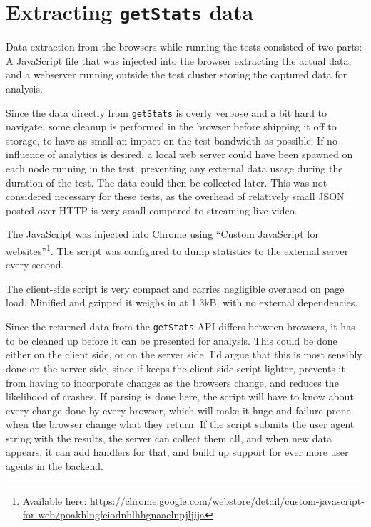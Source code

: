 \chapter{Extracting \texttt{getStats} data}

Data extraction from the browsers while running the tests consisted of two parts: A JavaScript file that was injected into the browser extracting the actual data, and a webserver running outside the test cluster storing the captured data for analysis.

Since the data directly from \texttt{getStats} is overly verbose and a bit hard to navigate, some cleanup is performed in the browser before shipping it off to storage, to have as small an impact on the test bandwidth as possible. If no influence of analytics is desired, a local web server could have been spawned on each node running in the test, preventing any external data usage during the duration of the test. The data could then be collected later. This was not considered necessary for these tests, as the overhead of relatively small JSON posted over HTTP is very small compared to streaming live video.

The JavaScript was injected into Chrome using ``Custom JavaScript for websites''\footnote{Available here: \url{https://chrome.google.com/webstore/detail/custom-javascript-for-web/poakhlngfciodnhlhhgnaaelnpjljija}}. The script was configured to dump statistics to the external server every second.

The client-side script is very compact and carries negligible overhead on page load. Minified and gzipped it weighs in at 1.3kB, with no external dependencies.

Since the returned data from the \texttt{getStats} API differs between browsers, it has to be cleaned up before it can be presented for analysis. This could be done either on the client side, or on the server side. I'd argue that this is most sensibly done on the server side, since if keeps the client-side script lighter, prevents it from having to incorporate changes as the browsers change, and reduces the likelihood of crashes. If parsing is done here, the script will have to know about every change done by every browser, which will make it huge and failure-prone when the browser change what they return. If the script submits the user agent string with the results, the server can collect them all, and when new data appears, it can add handlers for that, and build up support for ever more user agents in the backend.

